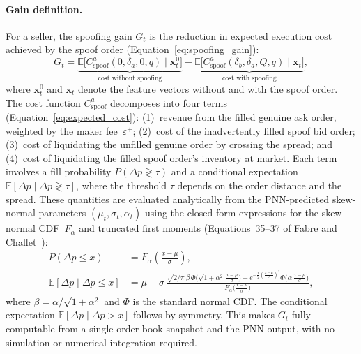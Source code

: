 \documentclass[11pt]{report}
\begin{document}
\paragraph{Gain definition.}
For a seller, the spoofing gain $G_t$ is the reduction in expected execution cost achieved by the spoof order (Equation~\eqref{eq:spoofing_gain}):
\begin{equation*}
  G_t = \underbrace{\mathbb{E}\!\bigl[C^a_{\text{spoof}}(0, \delta_a, 0, q) \mid \mathbf{x}^0_t\bigr]}_{\text{cost without spoofing}} - \underbrace{\mathbb{E}\!\bigl[C^a_{\text{spoof}}(\delta_b, \delta_a, Q, q) \mid \mathbf{x}_t\bigr]}_{\text{cost with spoofing}},
\end{equation*}
where $\mathbf{x}^0_t$ and $\mathbf{x}_t$ denote the feature vectors without and with the spoof order. The cost function $C^a_{\text{spoof}}$ decomposes into four terms (Equation~\eqref{eq:expected_cost}): (1)~revenue from the filled genuine ask order, weighted by the maker fee~$\varepsilon^+$; (2)~cost of the inadvertently filled spoof bid order; (3)~cost of liquidating the unfilled genuine order by crossing the spread; and (4)~cost of liquidating the filled spoof order's inventory at market. Each term involves a fill probability $P(\Delta p \gtrless \tau)$ and a conditional expectation $\mathbb{E}[\Delta p \mid \Delta p \gtrless \tau]$, where the threshold $\tau$ depends on the order distance and the spread. These quantities are evaluated analytically from the PNN-predicted skew-normal parameters $(\mu_t, \sigma_t, \alpha_t)$ using the closed-form expressions for the skew-normal CDF~$F_\alpha$ and truncated first moments (Equations~35--37 of Fabre and Challet~\cite{fabre_2025}):
\begin{align}
  P(\Delta p \leq x) &= F_\alpha\!\left(\frac{x - \mu}{\sigma}\right), \label{eq:skewnorm_cdf} \\[4pt]
  \mathbb{E}[\Delta p \mid \Delta p \leq x] &= \mu + \sigma\,\frac{\sqrt{2/\pi}\,\beta\,\Phi\!\bigl(\sqrt{1+\alpha^2}\,\tfrac{x-\mu}{\sigma}\bigr) - e^{-\frac{1}{2}\left(\frac{x-\mu}{\sigma}\right)^2}\Phi\!\bigl(\alpha\,\tfrac{x-\mu}{\sigma}\bigr)}{F_\alpha\!\bigl(\tfrac{x-\mu}{\sigma}\bigr)}, \label{eq:skewnorm_truncmean}
\end{align}
where $\beta = \alpha / \sqrt{1 + \alpha^2}$ and $\Phi$ is the standard normal CDF. The conditional expectation $\mathbb{E}[\Delta p \mid \Delta p > x]$ follows by symmetry. This makes $G_t$ fully computable from a single order book snapshot and the PNN output, with no simulation or numerical integration required.
\end{document}
